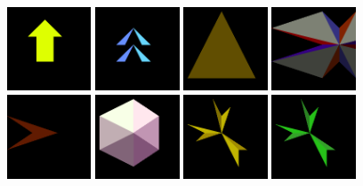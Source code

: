 \begin{figure}[H]
\includegraphics[width=2.5cm]{preface/obj2d/obj_17.png}
\includegraphics[width=2.5cm]{preface/obj2d/obj_18.png}
\includegraphics[width=2.5cm]{preface/obj2d/obj_19.png}
\includegraphics[width=2.5cm]{preface/obj2d/obj_2.png}
\includegraphics[width=2.5cm]{preface/obj2d/obj_20.png}
\includegraphics[width=2.5cm]{preface/obj2d/obj_21.png}
\includegraphics[width=2.5cm]{preface/obj2d/obj_22.png}
\includegraphics[width=2.5cm]{preface/obj2d/obj_23.png}

\end{figure}
